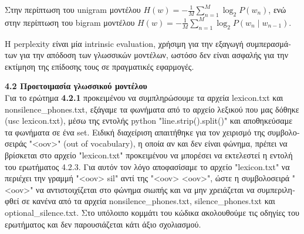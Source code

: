 \documentclass[a4paper,11pt]{article}
\begin{document}
\textgreek{Στην περίπτωση του }unigram \textgreek{μοντέλου} $
H(w) = -\frac{1}{M} \sum_{n=1}^{M} \log_2 P(w_n)$, \textgreek{ενώ στην περίπτωση του }bigram \textgreek{ μοντέλου} $H(w) = -\frac{1}{M} \sum_{n=1}^{M} \log_2 P(w_n \mid w_{n-1})$.

\textgreek{Η }perplexity \textgreek{είναι μία }intrinsic evaluation, \textgreek{χρήσιμη για την εξαγωγή συμπερασμάτων για την απόδοση των γλωσσικών μοντέλων, ωστόσο δεν είναι ασφαλής για την εκτίμηση της επίδοσης τους σε πραγματικές εφαρμογές. }

\textbf{4.2 Προετοιμασία γλωσσικού μοντέλου}\\

\textgreek{Για το ερώτημα \textbf{4.2.1} προκειμένου να συμπληρώσουμε τα αρχεία }lexicon.txt \textgreek{και} nonsilence\_phones.txt, \textgreek{εξάγαμε τα φωνήματα από το αρχείο λεξικού που μας δόθηκε} (usc lexicon.txt), \textgreek{μέσω της εντολής }python "line.strip().split()" \textgreek{και αποθηκεύσαμε τα φωνήματα σε ένα }set. \textgreek{Ειδική διαχείριση απαιτήθηκε για τον χειρισμό της συμβολοσειράς }"<oov>" (out of vocabulary), \textgreek{η οποία αν και δεν είναι φώνημα, πρέπει να βρίσκεται στο αρχείο }"lexicon.txt" \textgreek{προκειμένου να μπορέσει να εκτελεστεί η εντολή του ερωτήματος 4.2.3. Για αυτόν τον λόγο αποφασίσαμε το αρχείο }"lexicon.txt" \textgreek{να περιέχει την γραμμή }"<oov> sil" \textgreek{αντί της} "<oov> <oov>", \textgreek{ώστε η συμβολοσειρά }"<oov>" \textgreek{να αντιστοιχίζεται στο φώνημα σιωπής και να μην χρειάζεται να συμπεριληφθεί σε κανένα από τα αρχεία } nonsilence\_phones.txt, silence\_phones.txt \textgreek{και} optional\_silence.txt. \textgreek{Στο υπόλοιπο κομμάτι του κώδικα ακολουθούμε τις οδηγίες του ερωτήματος και δεν παρουσιάζεται κάτι άξιο σχολιασμού.}
\end{document}
